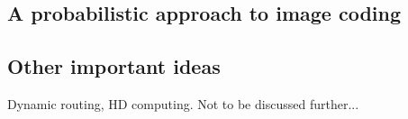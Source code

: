 \subsection{A probabilistic approach to image coding}


\subsection{Other important ideas}
Dynamic routing, HD computing. Not to be discussed further... 